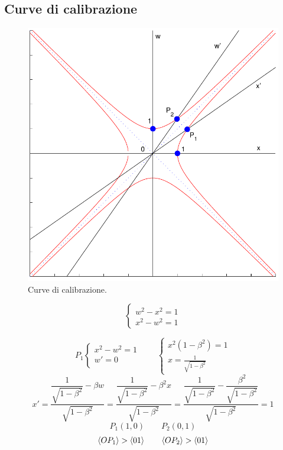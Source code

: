 \subsection{Curve di calibrazione}
\begin{figure}[htbp]
   \centering
   \includegraphics[scale=0.7]{immagini/fisica1/Minkowski_calibrazione}
   \caption{Curve di calibrazione.}
\end{figure}
\[\left\{\begin{array}{l}
      w^2-x^2=1 \\
      x^2-w^2=1\end{array}\right.\]

\[P_1\left\{\begin{array}{l}
      x^2-w^2=1 \\
      w'=0      \\
   \end{array}\right.\qquad \left\{\begin{array}{l}
      x^2(1-\beta^2)=1 \\
      x=\frac{1}{\sqrt{1-\beta^2}}\end{array}\right.\]
\[x'=\dfrac{\dfrac{1}{\sqrt{1-\beta^2}}-\beta w}{\sqrt{1-\beta^2}}=\dfrac{\dfrac{1}{\sqrt{1-\beta^2}}-\beta^2 x}{\sqrt{1-\beta^2}}=\dfrac{\dfrac{1}{\sqrt{1-\beta^2}}-\dfrac{\beta^2}{\sqrt{1-\beta^2}}}{\sqrt{1-\beta^2}}=1\]
\[P_1(1,0)\qquad P_2(0,1)\]
\[\left<OP_1\right>>\left<01\right>\qquad\left<OP_2\right>>\left<01\right>\]


